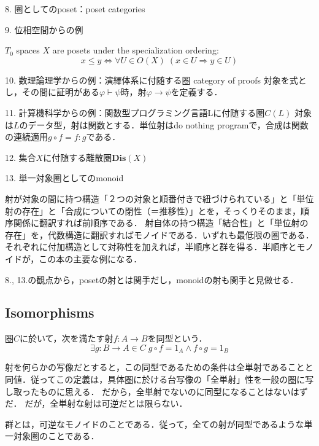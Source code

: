 \documentclass[uplatex, 12pt, dvipdfmx]{jsarticle}
\begin{document}
8. 圏としてのposet：poset categories

9. 位相空間からの例
\begin{proposition*}
    $T_0$ spaces $X$ are posets under the specialization ordering:
    \[ x\le y \Leftrightarrow \forall U\in O(X)\; (x\in U\Rightarrow y\in U) \]
\end{proposition*}

10. 数理論理学からの例：演繹体系に付随する圏 category of proofs
対象を式とし，その間に証明がある$\varphi\vdash\psi$時，射$\varphi\to\psi$を定義する．

11. 計算機科学からの例：関数型プログラミング言語Lに付随する圏$C(L)$
対象は$L$のデータ型，射は関数とする．単位射はdo nothing programで，合成は関数の連続適用$g\circ f=f:g$である．

12. 集合$X$に付随する離散圏$\mathbf{Dis}(X)$

13. 単一対象圏としてのmonoid

射が対象の間に持つ構造「２つの対象と順番付きで紐づけられている」と「単位射の存在」と「合成についての閉性（＝推移性）」とを，そっくりそのまま，順序関係に翻訳すれば前順序である．
射自体の持つ構造「結合性」と「単位射の存在」を，代数構造に翻訳すればモノイドである．いずれも最低限の圏である．
それぞれに付加構造として対称性を加えれば，半順序と群を得る．半順序とモノイドが，この本の主要な例になる．

8., 13.の観点から，posetの射とは関手だし，monoidの射も関手と見做せる．

\subsection{Isomorphisms}

\begin{definition}[同型]
    圏$C$に於いて，次を満たす射$f:A\to B$を同型という．
    \[ \exists g:B\to A\in C\; g\circ f=1_A \land f\circ g=1_B \]
\end{definition}
\begin{remark*}
    射を何らかの写像だとすると，この同型であるための条件は全単射であることと同値．従ってこの定義は，具体圏に於ける台写像の「全単射」性を一般の圏に写し取ったものに思える．
    だから，全単射でないのに同型になることはないはずだ．
    だが，全単射な射は可逆だとは限らない．
\end{remark*}

\begin{definition}[群]
    群とは，可逆なモノイドのことである．従って，全ての射が同型であるような単一対象圏のことである．
\end{definition}
\end{document}
